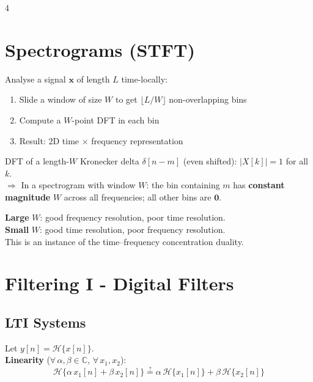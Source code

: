 \documentclass[8pt,a4paper,landscape]{extarticle}
\begin{document}
\begin{multicols*}{4}
\section{Spectrograms (STFT)}

\begin{defn}[title=Short-Time Fourier Transform]
Analyse a signal $\mathbf{x}$ of length $L$ time-locally:
\begin{enumerate}
  \item Slide a window of size $W$ to get $\lfloor L/W \rfloor$ non-overlapping bins
  \item Compute a $W$-point DFT in each bin
  \item Result: 2D time $\times$ frequency representation
\end{enumerate}
\end{defn}

\begin{prop}[title=Kronecker delta in spectrogram]
DFT of a length-$W$ Kronecker delta $\delta[n-m]$ (even shifted): $|X[k]|=1$ for all $k$.\\
$\Rightarrow$ In a spectrogram with window $W$: the bin containing $m$ has \textbf{constant magnitude} $W$ across all frequencies; all other bins are $\mathbf{0}$.
\end{prop}

\begin{warn}[title=Window size trade-off]
\textbf{Large} $W$: good frequency resolution, poor time resolution.\\
\textbf{Small} $W$: good time resolution, poor frequency resolution.\\
This is an instance of the time--frequency concentration duality.
\end{warn}


\newpage

\section{Filtering I - Digital Filters}

\subsection{LTI Systems}

\begin{defn}[title=Linearity \& time-invariance]
Let $y[n] = \mathcal{H}\{x[n]\}$. \\
\textbf{Linearity} ($\forall\, \alpha,\beta \in\mathbb{C}$, $\forall\, x_1, x_2$):
\[
    \mathcal{H}\{\alpha\, x_1[n] + \beta\, x_2[n]\} \stackrel{?}{=} \alpha\, \mathcal{H}\{x_1[n]\} + \beta\, \mathcal{H}\{x_2[n]\}
\]


\end{defn}
\end{multicols*}
\end{document}
